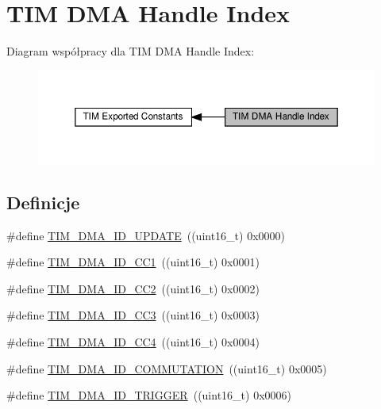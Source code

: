 \hypertarget{group___d_m_a___handle__index}{}\section{T\+IM D\+MA Handle Index}
\label{group___d_m_a___handle__index}
Diagram współpracy dla T\+IM D\+MA Handle Index\+:\nopagebreak
\begin{figure}[H]
\begin{center}
\leavevmode
\includegraphics[width=350pt]{group___d_m_a___handle__index}
\end{center}
\end{figure}
\subsection*{Definicje}
\begin{DoxyCompactItemize}
\item 
\#define \hyperlink{group___d_m_a___handle__index_ga15f38cee11f8b2b5a85cbf4552ba140d}{T\+I\+M\+\_\+\+D\+M\+A\+\_\+\+I\+D\+\_\+\+U\+P\+D\+A\+TE}~((uint16\+\_\+t) 0x0000)
\item 
\#define \hyperlink{group___d_m_a___handle__index_ga7ca691eb5e29b0206d3390cc6e90079a}{T\+I\+M\+\_\+\+D\+M\+A\+\_\+\+I\+D\+\_\+\+C\+C1}~((uint16\+\_\+t) 0x0001)
\item 
\#define \hyperlink{group___d_m_a___handle__index_ga9c52f32d4bd21dd2d232900219f0a111}{T\+I\+M\+\_\+\+D\+M\+A\+\_\+\+I\+D\+\_\+\+C\+C2}~((uint16\+\_\+t) 0x0002)
\item 
\#define \hyperlink{group___d_m_a___handle__index_ga6e8145f305b54744bf2ef379a4315a40}{T\+I\+M\+\_\+\+D\+M\+A\+\_\+\+I\+D\+\_\+\+C\+C3}~((uint16\+\_\+t) 0x0003)
\item 
\#define \hyperlink{group___d_m_a___handle__index_ga1860c00b370435ff40d9e65f14a61706}{T\+I\+M\+\_\+\+D\+M\+A\+\_\+\+I\+D\+\_\+\+C\+C4}~((uint16\+\_\+t) 0x0004)
\item 
\#define \hyperlink{group___d_m_a___handle__index_gaa707c98bb11277665635ca7aef1e4193}{T\+I\+M\+\_\+\+D\+M\+A\+\_\+\+I\+D\+\_\+\+C\+O\+M\+M\+U\+T\+A\+T\+I\+ON}~((uint16\+\_\+t) 0x0005)
\item 
\#define \hyperlink{group___d_m_a___handle__index_ga39900e5227e4d813a726a1df5d86671c}{T\+I\+M\+\_\+\+D\+M\+A\+\_\+\+I\+D\+\_\+\+T\+R\+I\+G\+G\+ER}~((uint16\+\_\+t) 0x0006)
\end{DoxyCompactItemize}


